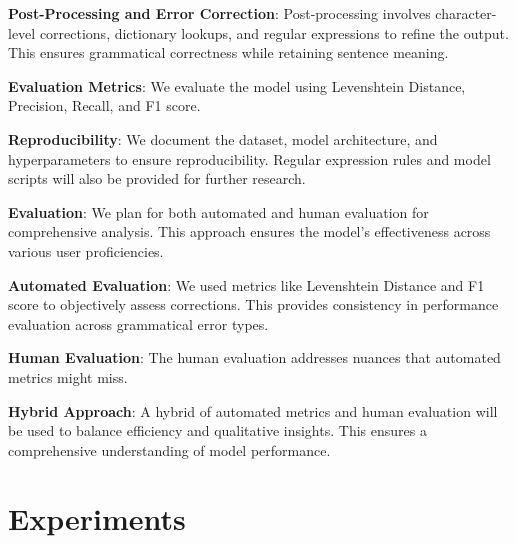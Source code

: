 \documentclass[11pt,a4paper]{article}
\begin{document}
\textbf{Post-Processing and Error Correction}: Post-processing involves character-level corrections, dictionary lookups, and regular expressions to refine the output. This ensures grammatical correctness while retaining sentence meaning.


\textbf{Evaluation Metrics}: We evaluate the model using Levenshtein Distance, Precision, Recall, and F1 score. 

\textbf{Reproducibility}: We document the dataset, model architecture, and hyperparameters to ensure reproducibility. Regular expression rules and model scripts will also be provided for further research.

\textbf{Evaluation}: We plan for both automated and human evaluation for comprehensive analysis. This approach ensures the model's effectiveness across various user proficiencies.


\textbf{Automated Evaluation}: We used metrics like Levenshtein Distance and F1 score to objectively assess corrections. This provides consistency in performance evaluation across grammatical error types.

\textbf{Human Evaluation}: 
The human evaluation addresses nuances that automated metrics might miss.

\textbf{Hybrid Approach}: A hybrid of automated metrics and human evaluation will be used to balance efficiency and qualitative insights. This ensures a comprehensive understanding of model performance.


\section{Experiments}
\end{document}
